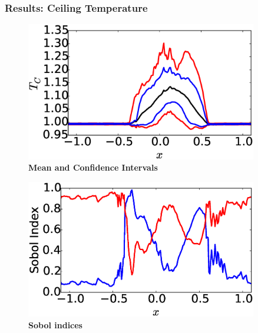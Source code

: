 \documentclass[9pt]{beamer}
\begin{document}
\begin{frame}
\frametitle{Results: Ceiling Temperature}
\label{sec-5-5}


\centering
\begin{minipage}[b]{0.45\linewidth}
\begin{figure}[ht]
\includegraphics[width=0.9\textwidth]{CeilingTempMeanPercentiles} \\
\textbf{Mean and Confidence Intervals}
\end{figure}
\end{minipage}
\begin{minipage}[b]{0.45\linewidth}
\begin{figure}[ht]
\includegraphics[width=0.9\textwidth]{SobolIndexCeilingTemp} \\
\textbf{Sobol indices}
\end{figure}
\end{minipage}


\end{frame}
\end{document}
